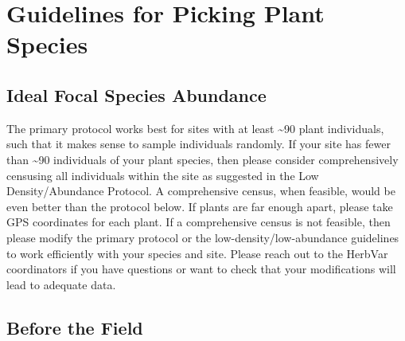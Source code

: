 \documentclass[
  letterpaper,
  DIV=11,
  numbers=noendperiod]{scrreprt}
\begin{document}
\section{Guidelines for Picking Plant
Species}\label{guidelines-for-picking-plant-species}

\subsection{Ideal Focal Species
Abundance}\label{ideal-focal-species-abundance}

The primary protocol works best for sites with at least
\textasciitilde90 plant individuals, such that it makes sense to sample
individuals randomly. If your site has fewer than \textasciitilde90
individuals of your plant species, then please consider comprehensively
censusing all individuals within the site as suggested in the Low
Density/Abundance Protocol. A comprehensive census, when feasible, would
be even better than the protocol below. If plants are far enough apart,
please take GPS coordinates for each plant. If a comprehensive census is
not feasible, then please modify the primary protocol or the
low-density/low-abundance guidelines to work efficiently with your
species and site. Please reach out to the HerbVar coordinators if you
have questions or want to check that your modifications will lead to
adequate data.

\subsection{Before the Field}\label{before-the-field}
\end{document}
